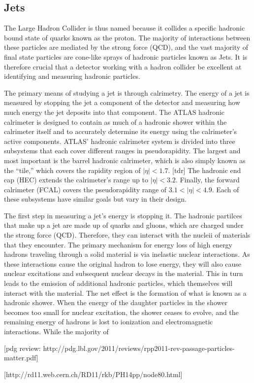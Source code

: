 \subsection{Jets}

The Large Hadron Collider is thus named because it collides a specific hadronic bound state of quarks known as the proton.
The majority of interactions between these particles are mediated by the strong force (QCD), and the vast majority of final state particles are cone-like sprays of hadronic particles known as Jets.
It is therefore crucial that a detector working with a hadron collider be excellent at identifying and measuring hadronic particles.

The primary means of studying a jet is through calrimetry.
The energy of a jet is measured by stopping the jet a component of the detector and measuring how much energy the jet deposits into that component.
The ATLAS hadronic calrimeter is designed to contain as much of a hadronic shower within the calrimeter itself and to accurately determine its energy using the calrimeter's active components.
ATLAS' hadronic calrimeter system is divided into three subsystems that each cover different ranges in pseudorapidity.  The largest and most important is the barrel hadronic calrimeter, which is also simply known as the ``tile,'' which covers the rapidity region of $|\eta| < 1.7$. [tdr]  The hadronic end cap (HEC) extends the calrimeter's range up to $|\eta| < 3.2$.  Finally, the forward calrimeter (FCAL) covers the pseudorapidity range of $3.1 < |\eta| < 4.9$.  Each of these subsystems have similar goals but vary in their design.

The first step in measuring a jet's energy is stopping it.  The hadronic partilces that make up a jet are made up of quarks and gluons, which are charged under the strong force (QCD).
Therefore, they can interact with the nucleii of materials that they encounter.
The primary mechanism for energy loss of high energy hadrons traveling through a solid material is via inelastic nuclear interactions.
As these interactions cause the original hadron to lose energy, they will also cause nuclear excitations and subsequent nuclear decays in the material.
This in turn leads to the emission of additional hadronic particles, which themselves will interact with the material.
The net effect is the formation of what is known as a hadronic shower.
When the energy of the daughter particles in the shower becomes too small for nuclear excitation, the shower ceases to evolve, and the remaining energy of hadrons is lost to ionization and electromagnetic interactions.
While the majority of 

[pdg review: http://pdg.lbl.gov/2011/reviews/rpp2011-rev-passage-particles-matter.pdf]

[http://rd11.web.cern.ch/RD11/rkb/PH14pp/node80.html]



